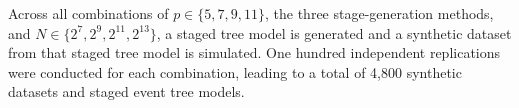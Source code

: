 \documentclass[preprint,12pt]{elsarticle}
\newcommand{\blue}{\color{blue}}
\begin{document}

 Across all combinations of $p \in \{5, 7, 9, 11\} $, the three stage-generation methods, and  \( N \in \{2^7, 2^9, 2^{11}, 2^{13}\}\), a staged tree model is generated and a synthetic dataset from that staged tree model is simulated. One hundred independent replications were conducted for each combination, leading to a total of 4,800 synthetic datasets and  staged event tree models.
\end{document}
